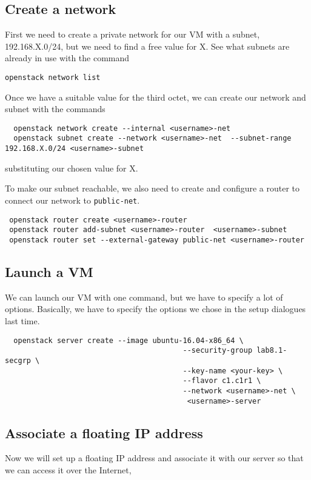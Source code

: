 \documentclass{article}
\begin{document}
\subsection{Create a network}
First we need to create a private network for our VM with a subnet, 192.168.X.0/24, but we need to find a free value for X. See what subnets are already in use with the command

 \texttt{openstack network list}
 
 Once we have a suitable value for the third octet, we can create our network and subnet with the commands

\begin{verbatim}
  openstack network create --internal <username>-net
  openstack subnet create --network <username>-net  --subnet-range 192.168.X.0/24 <username>-subnet
\end{verbatim}

substituting our chosen value for X.

To make our subnet reachable, we also need to create and configure a router to connect our network to \texttt{public-net}.

\begin{verbatim}
 openstack router create <username>-router
 openstack router add-subnet <username>-router  <username>-subnet
 openstack router set --external-gateway public-net <username>-router
\end{verbatim}

\subsection{Launch a VM}
We can launch our VM with one command, but we have to specify a lot of options. Basically, we have to specify the options we chose in the setup dialogues last time.

\begin{verbatim}
  openstack server create --image ubuntu-16.04-x86_64 \
                                         --security-group lab8.1-secgrp \
                                         --key-name <your-key> \
                                         --flavor c1.c1r1 \
                                         --network <username>-net \
                                          <username>-server
\end{verbatim}

\subsection{Associate a floating IP address}
Now we will set up a floating IP address and associate it with our server so that we can access it over the Internet,
\end{document}
